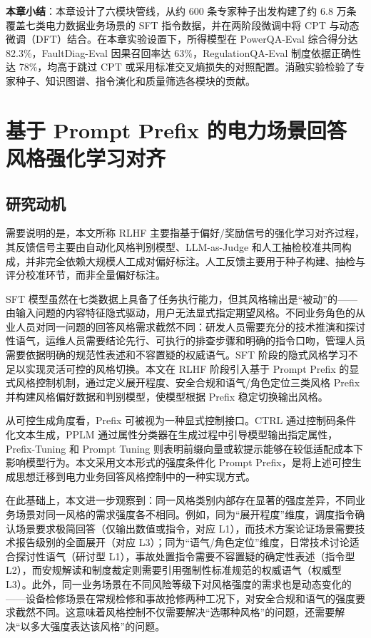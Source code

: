\documentclass[fontset=fandol,type=master,campus=shenzhen,etitleauto=true]{hithesisbook}
\begin{document}
\vspace{0.5cm}
\noindent \textbf{本章小结}：本章设计了六模块管线，从约 600 条专家种子出发构建了约 6.8 万条覆盖七类电力数据业务场景的 SFT 指令数据，并在两阶段微调中将 CPT 与动态微调（DFT）结合。在本章实验设置下，所得模型在 PowerQA-Eval 综合得分达 82.3\%，FaultDiag-Eval 因果召回率达 63\%，RegulationQA-Eval 制度依据正确性达 78\%，均高于跳过 CPT 或采用标准交叉熵损失的对照配置。消融实验检验了专家种子、知识图谱、指令演化和质量筛选各模块的贡献。

\chapter{基于 Prompt Prefix 的电力场景回答风格强化学习对齐}\label{ux57faux4e8e-prompt-prefix-ux7684ux7535ux529bux573aux666fux56deux7b54ux98ceux683cux5f3aux5316ux5b66ux4e60ux5bf9ux9f50}

\section{研究动机}\label{ux7814ux7a76ux52a8ux673a-1}

需要说明的是，本文所称 RLHF 主要指基于偏好/奖励信号的强化学习对齐过程，其反馈信号主要由自动化风格判别模型、LLM-as-Judge 和人工抽检校准共同构成，并非完全依赖大规模人工成对偏好标注。人工反馈主要用于种子构建、抽检与评分校准环节，而非全量偏好标注。

SFT 模型虽然在七类数据上具备了任务执行能力，但其风格输出是``被动''的------由输入问题的内容特征隐式驱动，用户无法显式指定期望风格。不同业务角色的从业人员对同一问题的回答风格需求截然不同：研发人员需要充分的技术推演和探讨性语气，运维人员需要结论先行、可执行的排查步骤和明确的指令口吻，管理人员需要依据明确的规范性表述和不容置疑的权威语气。SFT 阶段的隐式风格学习不足以实现灵活可控的风格切换。本文在 RLHF 阶段引入基于 Prompt Prefix 的显式风格控制机制，通过定义展开程度、安全合规和语气/角色定位三类风格 Prefix 并构建风格偏好数据和判别模型，使模型根据 Prefix 稳定切换输出风格。

从可控生成角度看，Prefix 可被视为一种显式控制接口。CTRL 通过控制码条件化文本生成\cite{ref36}，PPLM 通过属性分类器在生成过程中引导模型输出指定属性\cite{ref37}，Prefix-Tuning 和 Prompt Tuning 则表明前缀向量或软提示能够在较低适配成本下影响模型行为\cite{ref38,ref39}。本文采用文本形式的强度条件化 Prompt Prefix，是将上述可控生成思想迁移到电力业务回答风格控制中的一种实现方式。

在此基础上，本文进一步观察到：同一风格类别内部存在显著的强度差异，不同业务场景对同一风格的需求强度各不相同。例如，同为``展开程度''维度，调度指令确认场景要求极简回答（仅输出数值或指令，对应 L1），而技术方案论证场景需要技术报告级别的全面展开（对应 L3）；同为``语气/角色定位''维度，日常技术讨论适合探讨性语气（研讨型 L1），事故处置指令需要不容置疑的确定性表述（指令型 L2），而安规解读和制度裁定则需要引用强制性标准规范的权威语气（权威型 L3）。此外，同一业务场景在不同风险等级下对风格强度的需求也是动态变化的------设备检修场景在常规检修和事故抢修两种工况下，对安全合规和语气的强度要求截然不同。这意味着风格控制不仅需要解决``选哪种风格''的问题，还需要解决``以多大强度表达该风格''的问题。
\end{document}
